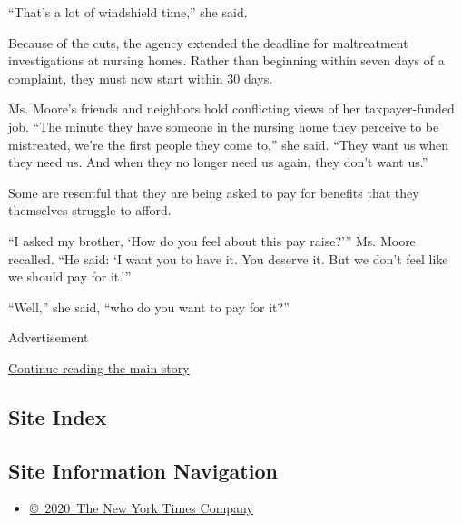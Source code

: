 ``That's a lot of windshield time,'' she said.

Because of the cuts, the agency extended the deadline for maltreatment
investigations at nursing homes. Rather than beginning within seven days
of a complaint, they must now start within 30 days.

Ms. Moore's friends and neighbors hold conflicting views of her
taxpayer-funded job. ``The minute they have someone in the nursing home
they perceive to be mistreated, we're the first people they come to,''
she said. ``They want us when they need us. And when they no longer need
us again, they don't want us.''

Some are resentful that they are being asked to pay for benefits that
they themselves struggle to afford.

``I asked my brother, `How do you feel about this pay raise?''' Ms.
Moore recalled. ``He said: `I want you to have it. You deserve it. But
we don't feel like we should pay for it.'''

``Well,'' she said, ``who do you want to pay for it?''

Advertisement

\protect\hyperlink{after-bottom}{Continue reading the main story}

\hypertarget{site-index}{%
\subsection{Site Index}\label{site-index}}

\hypertarget{site-information-navigation}{%
\subsection{Site Information
Navigation}\label{site-information-navigation}}

\begin{itemize}
\tightlist
\item
  \href{https://help.nytimes3xbfgragh.onion/hc/en-us/articles/115014792127-Copyright-notice}{©~2020~The
  New York Times Company}
\end{itemize}

